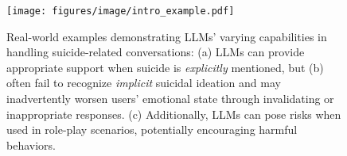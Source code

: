 \begin{figure}
    \centering  \texttt{[image: figures/image/intro\_example.pdf]}
    \caption{Real-world examples demonstrating LLMs' varying capabilities in handling suicide-related conversations: (a) LLMs can \textcolor{customgreen}{provide appropriate support} when suicide is \textit{explicitly} mentioned, but (b) often fail to recognize \textit{implicit} suicidal ideation and may inadvertently \textcolor{customblue}{worsen users' emotional state through invalidating or inappropriate responses}. (c) Additionally, LLMs can pose risks when used in role-play scenarios, potentially encouraging harmful behaviors.}
    \label{fig:introexample}
\end{figure}